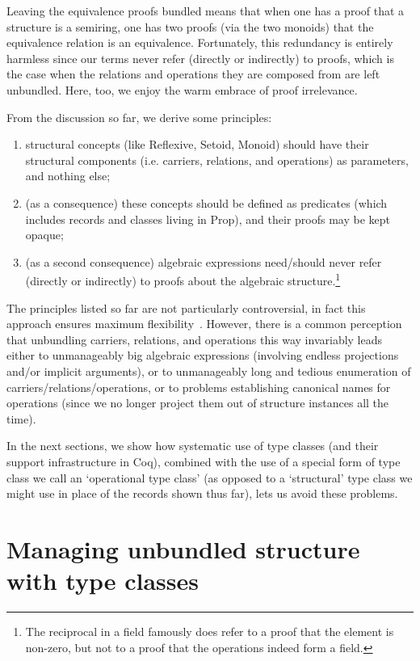\documentclass[a4paper,10pt,runningheads]{llncs}
\begin{document}
Leaving the equivalence proofs bundled means that when one has a proof that a structure
is a semiring, one has two proofs (via the two monoids) that the equivalence relation is an
equivalence. Fortunately, this redundancy is entirely harmless since our terms
never refer (directly or indirectly) to proofs, which is the case when the relations and operations
they are composed from are left unbundled. Here, too, we enjoy the warm embrace of proof
irrelevance.

From the discussion so far, we derive some principles:
\begin{enumerate}
 \item structural concepts (like Reflexive, Setoid, Monoid) should have their structural components
(i.e. carriers, relations, and operations) as parameters, and nothing else;
 \item (as a consequence) these concepts should be defined as predicates (which includes records and
classes living in Prop), and their proofs may be kept opaque;
 \item (as a second consequence) algebraic expressions need/should never refer (directly or
indirectly) to proofs about the algebraic structure.\footnote{The reciprocal in a field
famously does refer to a proof that the element is non-zero, but not to a proof that the operations
indeed form a field.}
\end{enumerate}

The principles listed so far are not particularly controversial, in fact this
approach ensures maximum flexibility~\cite{Hints}. However,
there is a common perception that unbundling carriers, relations, and operations this way invariably
leads either to unmanageably big algebraic expressions (involving endless projections and/or implicit
arguments), or to unmanageably long and tedious enumeration of carriers/relations/operations, or to
problems establishing canonical names for operations (since we no longer project them out of
structure instances all the time).

In the next sections, we show how systematic use of type classes (and their support infrastructure
in Coq), combined with the use of a special form of type class we call an `operational type class'
(as opposed to a `structural' type class we might use in place of the records shown thus far), lets
us avoid these problems.

\section{Managing unbundled structure with type classes}
\end{document}

